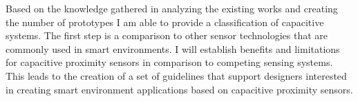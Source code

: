 \begin{enumerate}
Based on the knowledge gathered in analyzing the existing works and creating the number of prototypes I am able to provide a classification of capacitive systems. The first step is a comparison to other sensor technologies that are commonly used in smart environments. I will establish benefits and limitations for capacitive proximity sensors in comparison to competing sensing systems. This leads to the creation of a set of guidelines that support designers interested in creating smart environment applications based on capacitive proximity sensors.
\end{enumerate}

